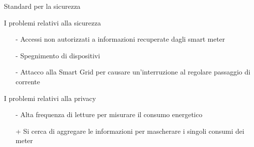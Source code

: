 


\begin{frame}{Standard per la sicurezza}
	\begin{block}{I problemi relativi alla sicurezza}
	\begin{itemize}
		\item[-] Accessi non autorizzati a informazioni recuperate dagli smart meter
		\item[-] Spegnimento di dispositivi
		\item[-] Attacco alla Smart Grid per causare un'interruzione al regolare passaggio di corrente
	\end{itemize}
	\end{block}		
	\pause
	\begin{block}{I problemi relativi alla privacy}
	\begin{itemize}
		\item[-] Alta frequenza di letture per misurare il consumo energetico
		\item[+] Si cerca di aggregare le informazioni per mascherare i singoli consumi dei meter
	\end{itemize}
	\end{block}		
\end{frame}


